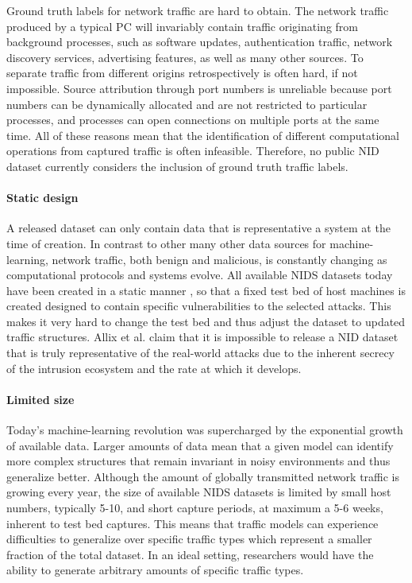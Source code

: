 Ground truth labels for network traffic are hard to obtain. The network traffic produced by a typical PC will invariably contain traffic originating from background processes, such as software updates, authentication traffic, network discovery services, advertising features, as well as many other sources. To separate traffic from different origins retrospectively is often hard, if not impossible. Source attribution through port numbers is unreliable because port numbers can be dynamically allocated and are not restricted to particular processes, and processes can open connections on multiple ports at the same time. 
All of these reasons mean that the identification of different computational operations from captured traffic is often infeasible. 
Therefore, no public NID dataset currently considers the inclusion of ground truth traffic labels.

\paragraph{Static design}

A released dataset can only contain data that is representative a system at the time of creation. In contrast to other many other data sources for machine-learning, network traffic, both benign and malicious, is constantly changing as computational protocols and systems evolve. All available NIDS datasets today have been created in a static manner , so that a fixed test bed of host machines is created designed to contain specific vulnerabilities to the selected attacks. This makes it very hard to change the test bed and thus adjust the dataset to updated traffic structures. Allix et al. \cite{allix2014machine} claim that it is impossible to release a NID dataset that is truly representative of the real-world attacks due to the inherent secrecy of the intrusion ecosystem and the rate at which it develops.


\paragraph{Limited size}
Today's machine-learning revolution was supercharged by the exponential growth of available data. Larger amounts of data mean that a given model can identify more complex structures that remain invariant in noisy environments and thus generalize better. Although the amount of globally transmitted network traffic is growing every year, the size of available NIDS datasets is limited by small host numbers, typically 5-10, and short capture periods, at maximum a 5-6 weeks, inherent to test bed captures. This means that traffic models can experience difficulties to generalize over specific traffic types which represent a smaller fraction of the total dataset. In an ideal setting, researchers would have the ability to generate arbitrary amounts of specific traffic types.


